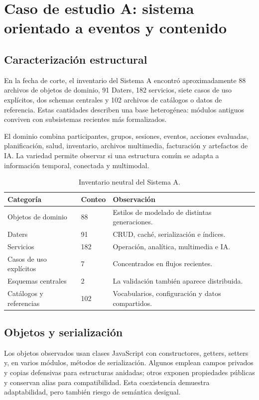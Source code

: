 \chapter{Caso de estudio A: sistema orientado a eventos y contenido}

\section{Caracterización estructural}

En la fecha de corte, el inventario del Sistema A encontró aproximadamente 88 archivos
de objetos de dominio, 91 Daters, 182 servicios, siete casos de uso explícitos, dos
schemas centrales y 102 archivos de catálogos o datos de referencia. Estas cantidades
describen una base heterogénea: módulos antiguos conviven con subsistemas recientes más
formalizados.

El dominio combina participantes, grupos, sesiones, eventos, acciones evaluadas,
planificación, salud, inventario, archivos multimedia, facturación y artefactos de IA.
La variedad permite observar si una estructura común se adapta a información temporal,
conectada y multimodal.

\begin{table}[H]
\centering
\caption{Inventario neutral del Sistema A.}
\label{tab:inventario-sistema-a}
\begin{tabularx}{\textwidth}{p{3.5cm}p{2.2cm}X}
\toprule
Categoría & Conteo & Observación \\
\midrule
Objetos de dominio & 88 & Estilos de modelado de distintas generaciones.\\
Daters & 91 & CRUD, caché, serialización e índices.\\
Servicios & 182 & Operación, analítica, multimedia e IA.\\
Casos de uso explícitos & 7 & Concentrados en flujos recientes.\\
Esquemas centrales & 2 & La validación también aparece distribuida.\\
Catálogos y referencias & 102 & Vocabularios, configuración y datos compartidos.\\
\bottomrule
\end{tabularx}
\end{table}

\section{Objetos y serialización}

Los objetos observados usan clases JavaScript con constructores, getters, setters y, en
varios módulos, métodos de serialización. Algunos emplean campos privados y copias
defensivas para estructuras anidadas; otros exponen propiedades públicas y conservan
alias para compatibilidad. Esta coexistencia demuestra adaptabilidad, pero también riesgo
de semántica desigual.


